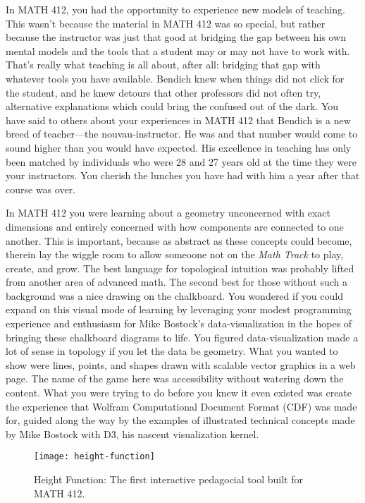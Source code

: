 \documentclass[../main.tex]{subfiles}
\begin{document}
In MATH 412, you had the opportunity to experience new models of teaching. This wasn't because the material in MATH 412 was so special, but rather because the instructor was just that good at bridging the gap between his own mental models and the tools that a student may or may not have to work with. That's really what teaching is all about, after all: bridging that gap with whatever tools you have available. Bendich knew when things did not click for the student, and he knew detours that other professors did not often try, alternative explanations which could bring the confused out of the dark. You have said to others about your experiences in MATH 412 that Bendich is a new breed of teacher---the nouvau-instructor. He was  and that number would come to sound higher than you would have expected. His excellence in teaching has only been matched by individuals who were 28 and 27 years old at the time they were your instructors. You cherish the lunches you have had with him a year after that course was over.

In MATH 412 you were learning about a geometry unconcerned with exact dimensions and entirely concerned with how components are connected to one another. This is important, because as abstract as these concepts could become, therein lay the wiggle room to allow someoone not on the \textit{Math Track} to play, create, and grow. The best language for topological intuition was probably lifted from another area of advanced math. The second best for those without such a background was a nice drawing on the chalkboard. You wondered if you could expand on this visual mode of learning by leveraging your modest programming experience and enthusiasm for Mike Bostock's data-visualization in the hopes of bringing these chalkboard diagrams to life. You figured data-visualization made a lot of sense in topology if you let the data be geometry. What you wanted to show were lines, points, and shapes drawn with scalable vector graphics in a web page. The name of the game here was accessibility without watering down the content. What you were trying to do before you knew it even existed was create the experience that Wolfram Computational Document Format (CDF) was made for, guided along the way by the examples of illustrated technical concepts made by Mike Bostock with D3, his nascent visualization kernel.

\begin{figure}[h!]
	\centering
	\texttt{[image: height-function]}
	\caption*{Height Function: The first interactive pedagocial tool built for MATH 412.}
\end{figure}
\end{document}

